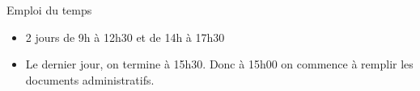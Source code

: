 \begin{frame}{Emploi du temps}
  \begin{itemize}
  \item 2 jours de 9h à 12h30 et de 14h à 17h30
  \item Le dernier jour, on termine à 15h30.
    Donc à 15h00 on commence à remplir les documents administratifs.
  \end{itemize}
\end{frame}

